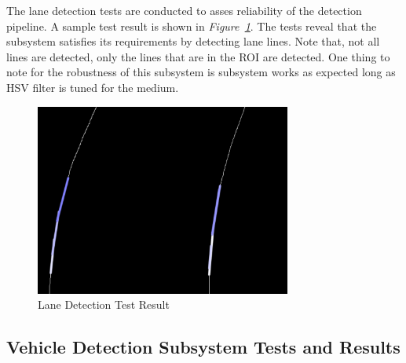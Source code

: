\documentclass[a4paper,12pt]{article}
\begin{document}
	The lane detection tests are conducted to asses reliability of the detection pipeline. A sample test result is shown in \textit{Figure~\ref{fig:laneD_test}}. The tests reveal that the subsystem satisfies its requirements by detecting lane lines. Note that, not all lines are detected, only the lines that are in the ROI are detected. One thing to note for the robustness of this subsystem is subsystem works as expected long as HSV filter is tuned for the medium.


	\begin{figure}[h]
		\includegraphics[width=0.75\textwidth,center]{images/laneD_test}
		\caption{Lane Detection Test Result \label{fig:laneD_test} }
	\end{figure}






\subsection {Vehicle Detection Subsystem Tests and Results}\label{sect:vhd}
\end{document}
